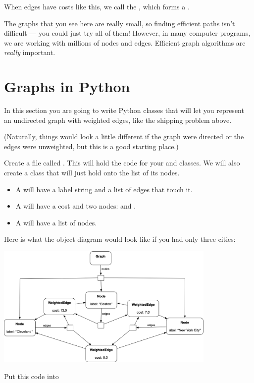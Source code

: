 When edges have costs like this, we call the , which forms a .

The graphs that you see here are really small, so finding efficient
paths isn't difficult --- you could just try all of them! However, in
many computer programs, we are working with millions of nodes and
edges. Efficient graph algorithms are \textit{really} important.
\section{Graphs in Python}

In this section you are going to write Python classes that will let
you represent an undirected graph with weighted edges, like the
shipping problem above.

(Naturally, things would look a little different if the graph were
directed or the edges were unweighted, but this is a good starting
place.)

Create a file called . This will hold the code for
your  and  classes. We will also
create a  class that will just hold onto the list of
its nodes.

\begin{itemize}
\item A  will have a label string and a list of edges that touch it.
\item A  will have a cost and two nodes:  and .
\item A  will have a list of nodes.
\end{itemize}

Here is what the object diagram would look like if you had only three cities:

\includegraphics[width=0.8\textwidth]{objdiagram.png}

Put this code into 

